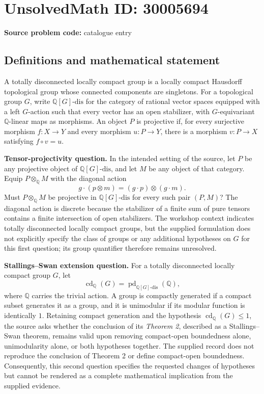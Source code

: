 \documentclass[11pt]{article}
\newcommand{\Q}{\mathbb{Q}}
\begin{document}
\section*{UnsolvedMath ID: 30005694}
\textbf{Source problem code:} catalogue entry
\subsection{Definitions and mathematical statement}
A totally disconnected locally compact group is a locally compact Hausdorff topological group whose connected components are singletons. For a topological group \(G\), write \(\Q[G]\text{-}\mathrm{dis}\) for the category of rational vector spaces equipped with a left \(G\)-action such that every vector has an open stabilizer, with \(G\)-equivariant \(\Q\)-linear maps as morphisms. An object \(P\) is projective if, for every surjective morphism \(f\colon X\to Y\) and every morphism \(u\colon P\to Y\), there is a morphism \(v\colon P\to X\) satisfying \(f\circ v=u\).

\textbf{Tensor-projectivity question.} In the intended setting of the source, let \(P\) be any projective object of \(\Q[G]\text{-}\mathrm{dis}\), and let \(M\) be any object of that category. Equip \(P\otimes_{\Q}M\) with the diagonal action
\[
 g\cdot(p\otimes m)=(g\cdot p)\otimes(g\cdot m).
\]
Must \(P\otimes_{\Q}M\) be projective in \(\Q[G]\text{-}\mathrm{dis}\) for every such pair \((P,M)\)? The diagonal action is discrete because the stabilizer of a finite sum of pure tensors contains a finite intersection of open stabilizers. The workshop context indicates totally disconnected locally compact groups, but the supplied formulation does not explicitly specify the class of groups or any additional hypotheses on \(G\) for this first question; its group quantifier therefore remains unresolved.

\textbf{Stallings--Swan extension question.} For a totally disconnected locally compact group \(G\), let
\[
 \operatorname{cd}_{\Q}(G)
 =\operatorname{pd}_{\Q[G]\text{-}\mathrm{dis}}(\Q),
\]
where \(\Q\) carries the trivial action. A group is compactly generated if a compact subset generates it as a group, and it is unimodular if its modular function is identically \(1\). Retaining compact generation and the hypothesis \(\operatorname{cd}_{\Q}(G)\leq 1\), the source asks whether the conclusion of its \emph{Theorem 2}, described as a Stallings--Swan theorem, remains valid upon removing compact-open boundedness alone, unimodularity alone, or both hypotheses together. The supplied record does not reproduce the conclusion of Theorem 2 or define compact-open boundedness. Consequently, this second question specifies the requested changes of hypotheses but cannot be rendered as a complete mathematical implication from the supplied evidence.
\end{document}
